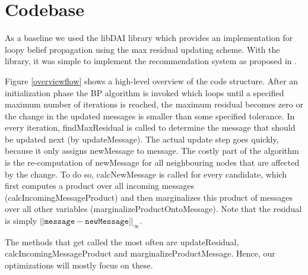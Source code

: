 \section{Codebase}\label{sec:code}

As a baseline we used the libDAI library \cite{Mooij_libDAI_10} which provides an implementation for loopy belief propagation using the max residual updating scheme. With the library, it was simple to implement the recommendation system as proposed in \cite{Ha:2012:TRT:2396761.2398636}.

Figure \ref{overviewflow} shows a high-level overview of the code structure. After an initialization phase the BP algorithm is invoked which loops until a specified maximum number of iterations is reached, the maximum residual becomes zero or the change in the updated messages is smaller than some specified tolerance. In every iteration, findMaxResidual is called to determine the message that should be updated next (by updateMessage). The actual update step goes quickly, because it only assigns newMessage to message. The costly part of the algorithm is the re-computation of newMessage for all neighbouring nodes that are affected by the change. To do so, calcNewMessage is called for every candidate, which first computes a product over all incoming messages (calcIncomingMessageProduct) and then marginalizes this product of messages over all other variables (marginalizeProductOntoMessage). Note that the residual is simply $||\mathtt{message}-\mathtt{newMessage}||_\infty$. 


The methods that get called the most often are updateResidual, calcIncomingMessageProduct and marginalizeProductMessage. Hence, our optimizations will mostly focus on these.

